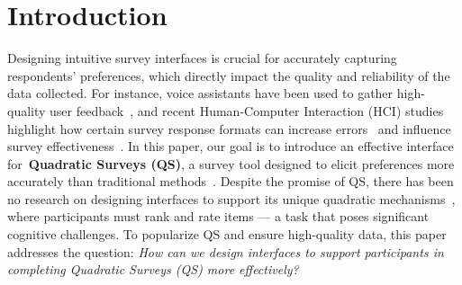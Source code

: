 \section{Introduction}

Designing intuitive survey interfaces is crucial for accurately capturing respondents' preferences, which directly impact the quality and reliability of the data collected. For instance, voice assistants have been used to gather high-quality user feedback~\cite{xiaoLetMeAsk2021}, and recent Human-Computer Interaction (HCI) studies highlight how certain survey response formats can increase errors~\cite{pielotDidYouMisclick2024, kim2019comparing} and influence survey effectiveness~\cite{ugur2015evaluating}. In this paper, our goal is to introduce an effective interface for~\textbf{Quadratic Surveys (QS)}, a survey tool designed to elicit preferences more accurately than traditional methods~\cite{chengCanShowWhat2021}. Despite the promise of QS, there has been no research on designing interfaces to support its unique quadratic mechanisms~\cite{grovesOptimalAllocationPublic1977}, where participants must rank and rate items --- a task that poses significant cognitive challenges. To popularize QS and ensure high-quality data, this paper addresses the question: \textit{How can we design interfaces to support participants in completing Quadratic Surveys (QS) more effectively?}

